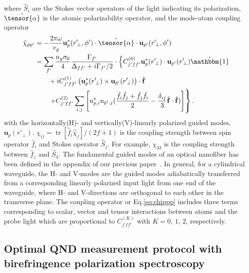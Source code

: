 \documentclass[aps,pra,twocolumn,superscriptaddress]{revtex4-1} %
\DeclareMathOperator{\tr}{tr}
\newcommand{\nn}{\nonumber}
\begin{document}
where $ \hat{S}_i $ are the Stokes vector operators of the light indicating its polarization, $ \hat{\tensor{\mathbf{\alpha}}} $ is the atomic polarizability operator, and the mode-atom coupling operator
\begin{align}
\hat{\chi}_{pp'} 
&=-\frac{2\pi \omega}{v_g}\mathbf{u}_{p}^*(r'\!_\perp,\phi')\cdot \hat{\tensor{\alpha}}\cdot \mathbf{u}_{p'}(r'\!_\perp,\phi')\\
&= \sum_{f'} \frac{n_g\sigma_0}{4}\frac{\Gamma_{f'}}{\Delta_{ff'}+i\Gamma_{f'}/2}\cdot \left\{ C_{j'ff'}^{(0)}\mathbf{u}_p^*(r'\!_\perp)\cdot \mathbf{u}_{p'}(r'\!_\perp)\hat{\mathbbm{1}}\right.\nn\\
&\quad\quad +iC_{j'ff'}^{(1)}\left(\mathbf{u}_p^*(r'\!_\perp)\times\mathbf{u}_{p'}(r'\!_\perp) \right)\cdot \hat{\mathbf{f}} \nonumber\\
&\quad\quad\left. + C_{j'ff'}^{(2)}\sum_{i,j}\left[u^*_{p,i}u_{p',j}(\frac{\hat{f}_i\hat{f}_j+\hat{f}_j\hat{f}_i}{2}-\frac{\delta_{ij}}{3}\hat{\mathbf{f}}\cdot\hat{\mathbf{f}}) \right]\right\}.
\label{eq:chippp}
\end{align}
with the horizontally(H)- and vertically(V)-linearly polarized guided modes, $ \mathbf{u}_p(r'\!_\perp) $. 
$ \chi_{ij}=\tr[\hat{f}_i\hat{\chi}_j]/(2f+1) $ is the coupling strength between spin operator $ \hat{f}_i $ and Stokes operator $ \hat{S}_j $. 
For example, $ \chi_{33} $ is the coupling strength between $ \hat{f}_z $ and $ \hat{S}_3 $.
The fundamental guided modes of an optical nanofiber has been defined in the appendix of our previous paper~\cite{Qi2016}. 
In general, for a cylindrical waveguide, the H- and V-modes are the guided modes adiabatically transferred from a corresponding linearly polarized input light from one end of the waveguide, where H- and V-directions are orthogonal to each other in the transverse plane.
The coupling operator or Eq.\eqref{eq:chippp} includes three terms corresponding to scalar, vector and tensor interactions between atoms and the probe light which are proportional to $ C_{j'ff'}^{(K)} $ with $ K=0,\,1,\,2 $, respectively.

\subsection{Optimal QND measurement protocol with birefringence polarization spectroscopy}
\end{document}
